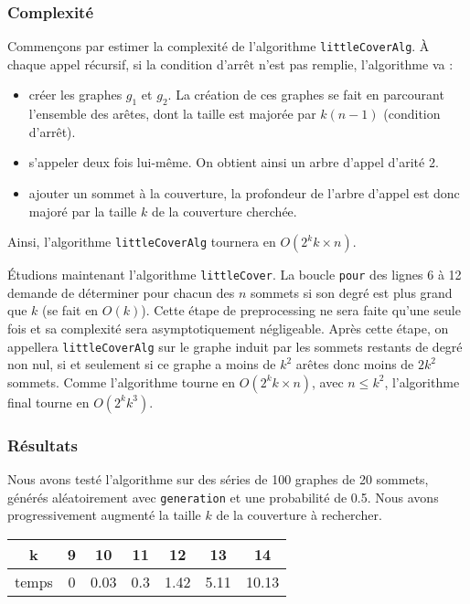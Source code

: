 \documentclass[a4paper,10pt]{article}
\newcommand*{\itemb}{\item[$\bullet$]}
\begin{document}
\subsubsection{Complexité}

Commençons par estimer la complexité de l'algorithme \texttt{littleCoverAlg}. À chaque appel récursif, si la condition d'arrêt n'est pas remplie, l'algorithme va :
\begin{itemize}
 \itemb créer les graphes $g_1$ et $g_2$. La création de ces graphes se fait en parcourant l'ensemble des arêtes, dont la taille est majorée par $k(n-1)$ (condition d'arrêt).
 \itemb s'appeler deux fois lui-même. On obtient ainsi un arbre d'appel d'arité 2.
 \itemb ajouter un sommet à la couverture, la profondeur de l'arbre d'appel est donc majoré par la taille $k$ de la couverture cherchée.
\end{itemize}

Ainsi, l'algorithme \texttt{littleCoverAlg} tournera en $O(2^k k\times n)$. 

\vspace{0.35cm}
Étudions maintenant l'algorithme \texttt{littleCover}. La boucle \texttt{pour} des lignes 6 à 12 demande de déterminer pour chacun des $n$ sommets si son degré est plus grand que $k$ (se fait en $O(k)$). Cette étape de preprocessing ne sera faite qu'une seule fois et sa complexité sera asymptotiquement négligeable. Après cette étape, on appellera \texttt{littleCoverAlg} sur le graphe induit par les sommets restants de degré non nul, si et seulement si ce graphe a moins de $k^2$ arêtes donc moins de $2k^2$ sommets. Comme l'algorithme tourne en $O(2^k k\times n)$, avec $n\leqslant k^2$, l'algorithme final tourne en $O(2^k k^3)$.

\subsubsection{Résultats}

Nous avons testé l'algorithme sur des séries de 100 graphes de 20 sommets, générés aléatoirement avec \texttt{generation} et une probabilité de 0.5.
Nous avons progressivement augmenté la taille $k$ de la couverture à rechercher.

\begin{center}
\begin{tabular}{|c|c|c|c|c|c|c|}
	\hline 
	k & 9 & 10 & 11 & 12 & 13 & 14  \\
	\hline
	temps & 0 & 0.03 & 0.3 & 1.42 & 5.11 & 10.13  \\
	\hline
\end{tabular}
\end{center}
\end{document}

